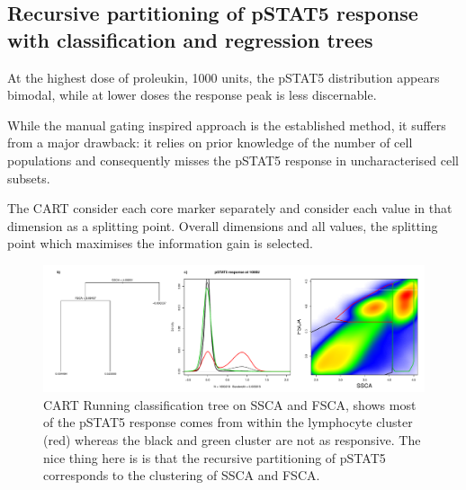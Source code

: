 




\subsection{Recursive partitioning of pSTAT5 response with classification and regression trees} 

At the highest dose of proleukin, 1000 units, the pSTAT5 distribution appears bimodal, while at lower doses the response peak is less discernable.

While the manual gating inspired approach is the established method, it suffers from a major drawback:
it relies on prior knowledge of the number of cell populations and consequently misses the pSTAT5 response in uncharacterised cell subsets.

The CART consider each core marker separately and consider each value in that dimension as a splitting point.
Overall dimensions and all values, the splitting point which maximises the information gain is selected.


\hspace{-2cm}
\begin{figure}[h]
\centering
\includegraphics[scale=.45]{IL2/figures/pstat5-response-decision-tree.pdf}
{ CART }
{
Running classification tree on SSCA and FSCA, shows most of the pSTAT5 response comes from within the lymphocyte cluster (red) whereas
the black and green cluster are not as responsive.
The nice thing here is is that the recursive partitioning of pSTAT5 corresponds to the clustering of SSCA and FSCA.
}
\end{figure}




